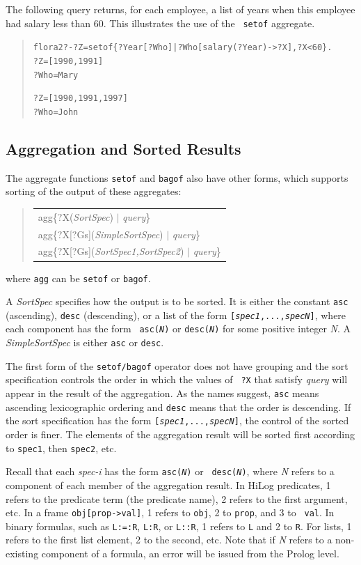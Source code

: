 \documentclass[11pt]{article}
\newcommand{\prompt}{flora2 ?- }
\newenvironment{qrules}{\begin{quote}\tt\begin{tabular}[t]{l}}%
{\end{tabular}\end{quote}}
\begin{document}
The following query returns, for each employee, a list of years when this
employee had salary less than 60. This illustrates the use of the {\tt
  setof} aggregate.
\begin{quote}
\begin{alltt}
\prompt ?Z = setof\{?Year[?Who]|?Who[salary(?Year)->?X], ?X < 60\}.
?Z = [1990,1991]
?Who = Mary

?Z = [1990,1991,1997]
?Who = John
\end{alltt}
\end{quote}

\subsection {Aggregation and Sorted Results}

The aggregate functions {\tt setof} and {\tt bagof}
also have other forms, which supports sorting of the output of these
aggregates:  
\begin{qrules}
agg\{?X({\it SortSpec}) $|$ {\it query}\}\\
agg\{?X[?Gs]({\it SimpleSortSpec}) $|$ {\it query}\}\\
agg\{?X[?Gs]({\it SortSpec1,SortSpec2}) $|$ {\it query}\}
\end{qrules}
where {\tt agg} can be {\tt setof} or {\tt bagof}.

A {\it SortSpec} specifies how the output is to be sorted. It is either the
constant {\tt asc} (ascending), {\tt desc} (descending), or a list of the
form {\tt [{\it spec1},...,{\it specN}]}, where each component has the form {\tt
  asc({\it N})} or {\tt desc({\it N})} for some positive integer {\it N}.      
A {\it SimpleSortSpec} is either {\tt asc} or {\tt desc}.   

The first form of the {\tt setof/bagof} operator does not have grouping 
and the sort specification controls the order in which the values of {\tt
  ?X} that satisfy {\it query} will appear in the result of the aggregation.
As the names suggest, {\tt asc} means ascending
lexicographic ordering and {\tt desc} means that the order is descending.  
If the sort specification has the form {\tt [{\it spec1},...,{\it specN}]},
the control of the sorted order is finer. The elements of the aggregation
result will be sorted first according to {\tt spec1}, then {\tt spec2}, etc.

Recall that each \emph{spec-i}  has the form {\tt asc({\it N})} or {\tt
  desc({\it N})}, where \emph{N} refers to a component of each
member of the aggregation result. In HiLog predicates, 1 refers to the predicate term
(the predicate name), 2 refers to the first argument, etc. In a frame
{\tt obj[prop->val]}, 1 refers to {\tt obj}, 2 to {\tt prop}, and 3 to {\tt
  val}. In binary formulas, such as {\tt L:=:R}, {\tt L:R}, or {\tt L::R},
1 refers to {\tt L} and 2 to {\tt R}.  
For lists, 1 refers to the first list element, 2 to the second, etc.
Note that if {\it N} refers to a non-existing component of a formula, an
error will be issued from the Prolog level.
\end{document}
